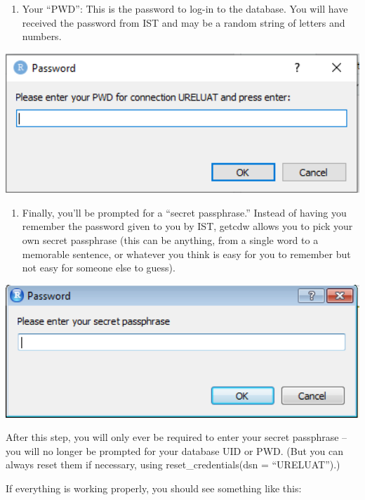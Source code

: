 \documentclass[]{book}
\providecommand{\tightlist}{%
  \setlength{\itemsep}{0pt}\setlength{\parskip}{0pt}}
\begin{document}
\begin{enumerate}
\def\labelenumi{\arabic{enumi})}
\setcounter{enumi}{1}
\tightlist
\item
  Your ``PWD'': This is the password to log-in to the database. You will have received the password from IST and may be a random string of letters and numbers.
\end{enumerate}

\includegraphics[width=5.61in]{images/PWD}

\begin{enumerate}
\def\labelenumi{\arabic{enumi})}
\setcounter{enumi}{2}
\tightlist
\item
  Finally, you'll be prompted for a ``secret passphrase.'' Instead of having you remember the password given to you by IST, getcdw allows you to pick your own secret passphrase (this can be anything, from a single word to a memorable sentence, or whatever you think is easy for you to remember but not easy for someone else to guess).
\end{enumerate}

\includegraphics[width=5.67in]{images/passphrase}

After this step, you will only ever be required to enter your secret passphrase -- you will no longer be prompted for your database UID or PWD. (But you can always reset them if necessary, using reset\_credentials(dsn = ``URELUAT'').)

If everything is working properly, you should see something like this:
\end{document}
